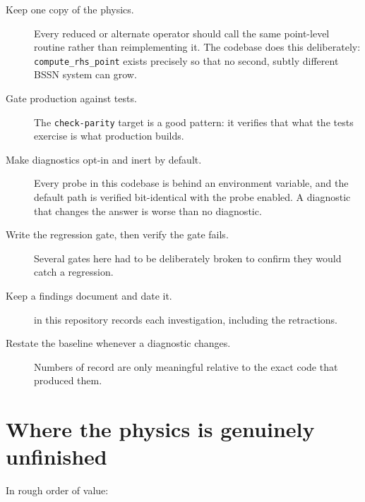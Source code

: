 \documentclass[11pt,openany]{book}
\begin{document}
\begin{description}
\item[Keep one copy of the physics.] Every reduced or alternate operator should
      call the same point-level routine rather than reimplementing it. The
      codebase does this deliberately: \texttt{compute\_rhs\_point} exists
      precisely so that no second, subtly different BSSN system can grow.
\item[Gate production against tests.] The \texttt{check-parity} target is a
      good pattern: it verifies that what the tests exercise is what production
      builds.
\item[Make diagnostics opt-in and inert by default.] Every probe in this
      codebase is behind an environment variable, and the default path is
      verified bit-identical with the probe enabled. A diagnostic that changes
      the answer is worse than no diagnostic.
\item[Write the regression gate, then verify the gate fails.] Several gates
      here had to be deliberately broken to confirm they would catch a
      regression.
\item[Keep a findings document and date it.]  in this
      repository records each investigation, including the retractions.
\item[Restate the baseline whenever a diagnostic changes.] Numbers of record
      are only meaningful relative to the exact code that produced them.
\end{description}

\section{Where the physics is genuinely unfinished}
\label{sec:unfinished}

In rough order of value:
\end{document}
